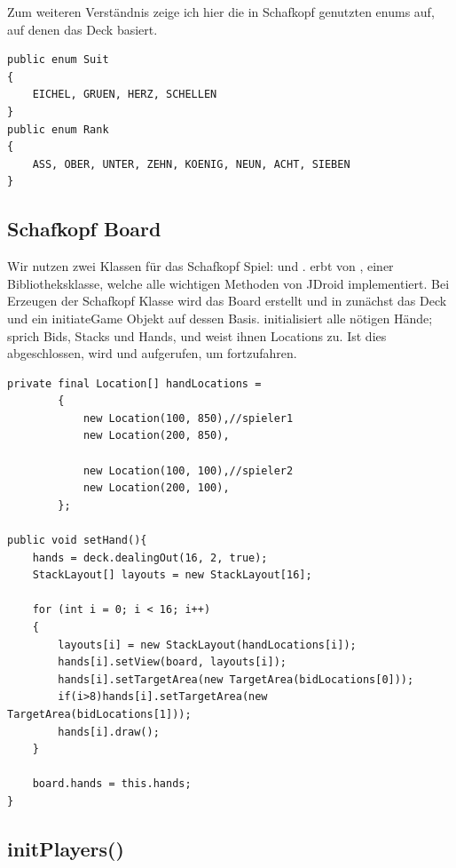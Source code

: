Zum weiteren Verständnis zeige ich hier die in Schafkopf genutzten enums auf,
auf denen das Deck basiert.

\begin{lstlisting}[caption={Enums für Kartenwertigkeiten},captionpos=b]
public enum Suit
{
    EICHEL, GRUEN, HERZ, SCHELLEN
}
public enum Rank
{
    ASS, OBER, UNTER, ZEHN, KOENIG, NEUN, ACHT, SIEBEN
}
\end{lstlisting}

\subsection{Schafkopf Board}

Wir nutzen zwei Klassen für das Schafkopf Spiel:  und
.  erbt von , einer
Bibliotheksklasse, welche alle wichtigen Methoden von JDroid implementiert. Bei
Erzeugen der Schafkopf Klasse wird das Board erstellt und in 
zunächst das Deck und ein initiateGame Objekt auf dessen Basis.
 initialisiert alle nötigen Hände; sprich Bids, Stacks und
Hands, und weist ihnen Locations zu. Ist dies abgeschlossen, wird
 und  aufgerufen, um fortzufahren.

\begin{lstlisting}[caption={Beispiel Hands initialisieren},captionpos=b]
private final Location[] handLocations =
        {
            new Location(100, 850),//spieler1
            new Location(200, 850),

            new Location(100, 100),//spieler2
            new Location(200, 100),
        };

public void setHand(){
    hands = deck.dealingOut(16, 2, true);
    StackLayout[] layouts = new StackLayout[16];

    for (int i = 0; i < 16; i++)
    {
        layouts[i] = new StackLayout(handLocations[i]);
        hands[i].setView(board, layouts[i]);
        hands[i].setTargetArea(new TargetArea(bidLocations[0]));
        if(i>8)hands[i].setTargetArea(new TargetArea(bidLocations[1]));
        hands[i].draw();
    }

    board.hands = this.hands;
}

\end{lstlisting}

\subsection{initPlayers()}

